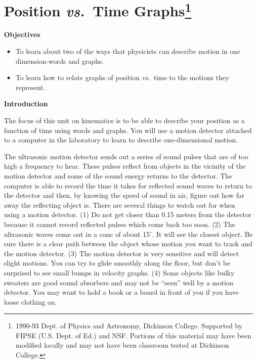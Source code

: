 
\section{Position \textit{vs.}~Time Graphs\footnote{
1990-93 Dept. of Physics and Astronomy, Dickinson College. Supported by FIPSE
(U.S. Dept. of Ed.) and NSF. Portions of this material may have been modified
locally and may not have been classroom tested at Dickinson College.
}}

\makelabheader %

\textbf{Objectives} 

\begin{itemize}
\item To learn about two of the ways that physicists can describe motion in one dimension-words
and graphs. 
\item To learn how to relate graphs of position \textit{vs.}~time to the motions they represent.
\end{itemize}
\textbf{Introduction} 

The focus of this unit on kinematics is to be able to describe your position
as a function of time using words and graphs. You will use a motion detector
attached to a computer in the laboratory to learn to describe one-dimensional
motion.

The ultrasonic motion detector sends out a series of sound pulses that are of
too high a frequency to hear. These pulses reflect from objects in the vicinity
of the motion detector and some of the sound energy returns to the detector.
The computer is able to record the time it takes for reflected sound waves to
return to the detector and then, by knowing the speed of sound in air, figure
out how far away the reflecting object is. There are several things to watch
out for when using a motion detector. (1) Do not get closer than 0.15 meters
from the detector because it cannot record reflected pulses which come back
too soon. (2) The ultrasonic waves come out in a cone of about 15\( ^{\circ } \).
It will see the closest object. Be sure there is a clear path between the object
whose motion you want to track and the motion detector. (3) The motion detector
is very sensitive and will detect slight motions. You can try to glide smoothly
along the floor, but don't be surprised to see small bumps in velocity graphs.
(4) Some objects like bulky sweaters are good sound absorbers and may not be
``seen'' well by a motion detector. You may want to hold a book
or a board in front of you if you have loose clothing on.

